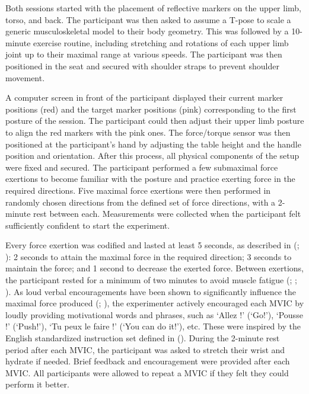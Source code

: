 Both sessions started with the placement of reflective markers on the upper limb, torso, and back. The participant was then asked to assume a T-pose to scale a generic musculoskeletal model to their body geometry. This was followed by a 10-minute exercise routine, including stretching and rotations of each upper limb joint up to their maximal range at various speeds. The participant was then positioned in the seat and secured with shoulder straps to prevent shoulder movement.

A computer screen in front of the participant displayed their current marker positions (red) and the target marker positions (pink) corresponding to the first posture of the session. The participant could then adjust their upper limb posture to align the red markers with the pink ones. The force/torque sensor was then positioned at the participant's hand by adjusting the table height and the handle position and orientation. After this process, all physical components of the setup were fixed and secured. The participant performed a few submaximal force exertions to become familiar with the posture and practice exerting force in the required directions. Five maximal force exertions were then performed in randomly chosen directions from the defined set of force directions, with a 2-minute rest between each. Measurements were collected when the participant felt sufficiently confident to start the experiment.

Every force exertion was codified and lasted at least 5 seconds, as described in (\cite{perdeauxInvestigatingRoleShoulder2010}; \cite{choppFeasibilityObtainingMultiple2010}): 2 seconds to attain the maximal force in the required direction; 3 seconds to maintain the force; and 1 second to decrease the exerted force. Between exertions, the participant rested for a minimum of two minutes to avoid muscle fatigue (\cite{chaffinOccupationalBiomechanics2006}; \cite{perdeauxInvestigatingRoleShoulder2010}; \cite{choppFeasibilityObtainingMultiple2010}). As loud verbal encouragements have been shown to significantly influence the maximal force produced (\cite{jungEffectsInstructionVerbal1999}; \cite{johanssonRelationshipVerbalCommand1983a}), the experimenter actively encouraged each MVIC by loudly providing motivational words and phrases, such as `Allez !' (`Go!'), `Pousse !' (`Push!'), `Tu peux le faire !' (`You can do it!'), etc. These were inspired by the English standardized instruction set defined in (\cite{mathiowetzReliabilityValidityGrip1984a}). During the 2-minute rest period after each MVIC, the participant was asked to stretch their wrist and hydrate if needed. Brief feedback and encouragement were provided after each MVIC. All participants were allowed to repeat a MVIC if they felt they could perform it better.

